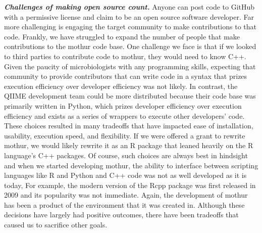 \documentclass[11pt,]{article}
\begin{document}
\textbf{\emph{Challenges of making open source count.}} Anyone can post
code to GitHub with a permissive license and claim to be an open source
software developer. Far more challenging is engaging the target
community to make contributions to that code. Frankly, we have struggled
to expand the number of people that make contributions to the mothur
code base. One challenge we face is that if we looked to third parties
to contribute code to mothur, they would need to know C++. Given the
paucity of microbiologists with any programming skills, expecting that
community to provide contributors that can write code in a syntax that
prizes execution efficiency over developer efficiency was not likely. In
contrast, the QIIME development team could be more distributed because
their code base was primarily written in Python, which prizes developer
efficiency over execution efficiency and exists as a series of wrappers
to execute other developers' code. These choices resulted in many
tradeoffs that have impacted ease of installation, usability, execution
speed, and flexibility. If we were offered a grant to rewrite mothur, we
would likely rewrite it as an R package that leaned heavily on the R
language's C++ packages. Of course, such choices are always best in
hindsight and when we started developing mothur, the ability to
interface between scripting languages like R and Python and C++ code was
not as well developed as it is today, For example, the modern version of
the Rcpp package was first released in 2009 and its popularity was not
immediate. Again, the development of mothur has been a product of the
environment that it was created in. Although these decisions have
largely had positive outcomes, there have been tradeoffs that caused us
to sacrifice other goals.
\end{document}
